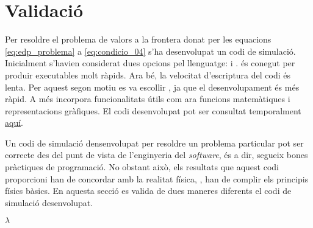 
\section{Validació}

Per resoldre el problema de valors a la frontera donat per les equacions \eqref{eq:edp_problema} a \eqref{eq:condicio_04} s'ha desenvolupat un codi de simulació. Inicialment s'havien considerat dues opcions pel llenguatge: \CC i \MATLAB. \CC és conegut per produir executables molt ràpids. Ara bé, la velocitat d'escriptura del codi és lenta. Per aquest segon motiu es va escollir \MATLAB, ja que el desenvolupament és més ràpid. A més incorpora funcionalitats útils com ara funcions matemàtiques i representacions gràfiques. El codi desenvolupat pot ser consultat temporalment \href{https://github.com/plosan/gas_dynamics_heat_and_mass_transfer/tree/main/projecte_02}{aquí}.

Un codi de simulació densenvolupat per resoldre un problema particular pot ser correcte des del punt de vista de l'enginyeria del \emph{software}, és a dir, segueix bones pràctiques de programació. No obstant això, els resultats que aquest codi proporcioni han de concordar amb la realitat física, \ie, han de complir els principis físics bàsics. En aquesta secció es valida de dues maneres diferents el codi de simulació desenvolupat.




$\lambda$




